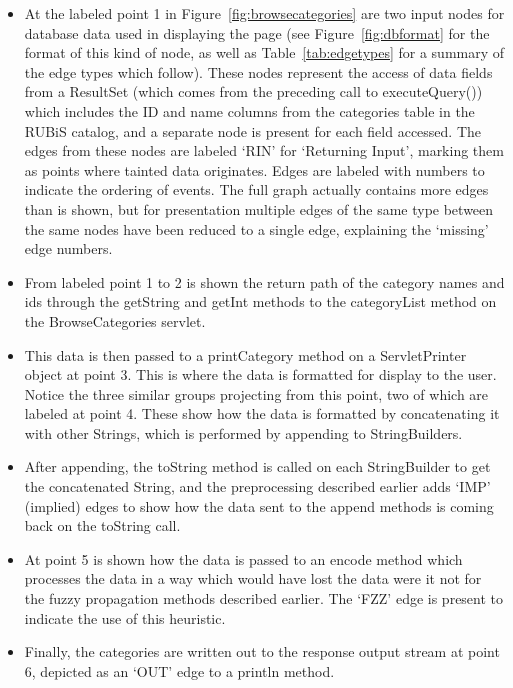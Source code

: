 \documentclass[msc,oneside]{ubcthesis}
\begin{document}
\begin{itemize}
\item At the labeled point 1 in Figure~\ref{fig:browsecategories} are two input nodes for database data used in displaying the page (see Figure~\ref{fig:dbformat} for the format of this kind of node, as well as Table~\ref{tab:edgetypes} for a summary of the edge types which follow). These nodes represent the access of data fields from a ResultSet (which comes from the preceding call to executeQuery()) which includes the ID and name columns from the categories table in the RUBiS catalog, and a separate node is present for each field accessed. The edges from these nodes are labeled `RIN' for `Returning Input', marking them as points where tainted data originates. Edges are labeled with numbers to indicate the ordering of events. The full graph actually contains more edges than is shown, but for presentation multiple edges of the same type between the same nodes have been reduced to a single edge, explaining the `missing' edge numbers.
\item From labeled point 1 to 2 is shown the return path of the category names and ids through the getString and getInt methods to the categoryList method on the BrowseCategories servlet. 
\item This data is then passed to a printCategory method on a ServletPrinter object at point 3. This is where the data is formatted for display to the user. Notice the three similar groups projecting from this point, two of which are labeled at point 4. These show how the data is formatted by concatenating it with other Strings, which is performed by appending to StringBuilders.
\item After appending, the toString method is called on each StringBuilder to get the concatenated String, and the preprocessing described earlier adds `IMP' (implied) edges to show how the data sent to the append methods is coming back on the toString call.
\item At point 5 is shown how the data is passed to an encode method which processes the data in a way which would have lost the data were it not for the fuzzy propagation methods described earlier. The `FZZ' edge is present to indicate the use of this heuristic.
\item Finally, the categories are written out to the response output stream at point 6, depicted as an `OUT' edge to a println method.
\end{itemize}   

\end{document}
